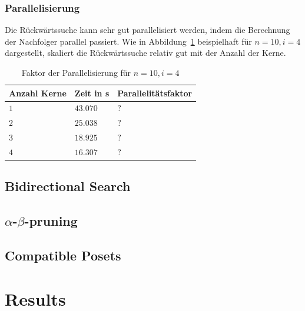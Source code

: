 \documentclass[10pt,journal,compsoc]{IEEEtran}
\begin{document}
\subsubsection{Parallelisierung}
Die Rückwärtssuche kann sehr gut parallelisiert werden, indem die Berechnung der Nachfolger parallel passiert. Wie in Abbildung~\ref{table:backward-parallel} beispielhaft für $n = 10, i = 4$ dargestellt, skaliert die Rückwärtssuche relativ gut mit der Anzahl der Kerne.

\begin{table}
  \begin{tabular}{l|l|l}
    Anzahl Kerne & Zeit in s & Parallelitätsfaktor \\
    \hline
    $1$          & $43.070$  & $?$                 \\ %
    $2$          & $25.038$  & $?$                 \\
    $3$          & $18.925$  & $?$                 \\
    $4$          & $16.307$  & $?$                 \\
  \end{tabular}
  \centering
  \caption{Faktor der Parallelisierung für $n = 10, i = 4$}
  \label{table:backward-parallel}
\end{table}


\subsection{Bidirectional Search}

\subsection{$\alpha$-$\beta$-pruning}

\subsection{Compatible Posets}

\section{Results}
\end{document}

